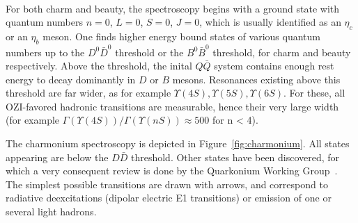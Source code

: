 \\
For both charm and beauty, the spectroscopy begins with a ground state
with quantum numbers $n=0$, $L=0$, $S=0$, $J=0$, which is usually
identified as an $\eta_{c}$ or an $\eta_{b}$ meson. One finds higher energy bound states of various quantum numbers up
to the $D^{0}\bar{D}^{0}$ 
threshold or the $B^{0}\bar{B}^{0}$ threshold, for charm and beauty
respectively. Above the threshold, the inital $Q\bar{Q}$
system contains enough rest energy to decay dominantly in $D$ or
$B$ mesons. Resonances existing above this threshold are far wider, as for
example $\Upsilon(4S), \Upsilon(5S), \Upsilon(6S)$. For these, all
OZI-favored hadronic transitions are measurable, hence their very
large width (for example $\Gamma(\Upsilon(4S)) / \Gamma(\Upsilon(nS))
\approx 500$ for n < 4).

The charmonium spectroscopy is depicted in Figure~\ref{fig:charmonium}. All
states appearing are below the $D\bar{D}$ threshold. Other states have
been discovered, for which a very consequent review is done by the
Quarkonium Working Group~\cite{nora}. The simplest possible
transitions are drawn with arrows, and correspond to radiative
deexcitations (dipolar electric E1 transitions) or emission of one or
several light hadrons.


